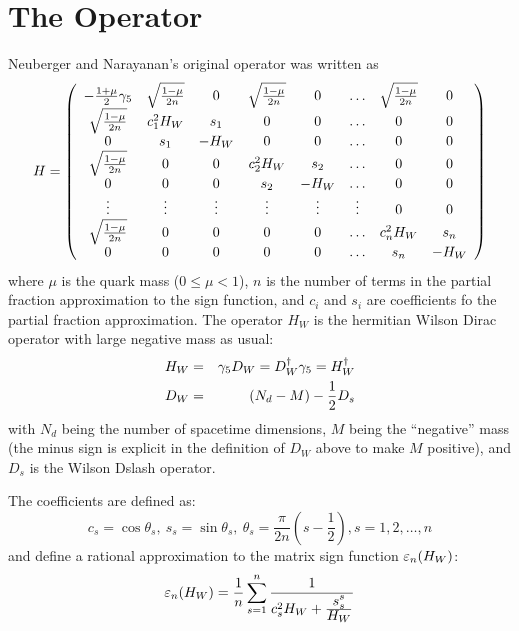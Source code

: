 \documentclass[12pt]{article}
\begin{document}
\section{The Operator}
Neuberger and Narayanan's original operator was written as
\begin{equation}
H = \left( \begin{array}{cccccccc} 
-\frac{1+\mu}{2}\gamma_5 & \sqrt{\frac{1-\mu}{2n}} & 0 & \sqrt{\frac{1-\mu}{2n}} & 0  & \ldots & \sqrt{\frac{1-\mu}{2n}} & 0 \\
\sqrt{\frac{1-\mu}{2n}} & c_1^2 H_W & s_1 &  0 & 0& \ldots & 0 & 0\\
          0            &   s_1     & -H_W &  0 & 0& \ldots & 0 & 0\\
\sqrt{\frac{1-\mu}{2n}} &     0    &  0  & c_2^2 H_W & s_2  & \ldots & 0 & 0 \\
          0             &     0    &  0  & s_2       & -H_W & \ldots & 0 & 0 \\
       \vdots           &   \vdots & \vdots & \vdots & \vdots & \vdots & 0 & 0 \\
\sqrt{\frac{1-\mu}{2n}} &     0    &  0 &  0         & 0     & \ldots & c_n^2 H_W & s_n \\
         0              &     0    &  0 &  0         &  0    & \ldots & s_{n} & -H_W \\
\end{array} \right)
\end{equation}
where $\mu$ is the quark mass ($0 \le \mu < 1$), $n$ is the number of terms
in the partial fraction approximation to the sign function, and $c_{i}$ and $s_i$ are coefficients fo the partial fraction approximation. The operator $H_W$ is
the hermitian Wilson Dirac operator with large negative mass as usual:
\begin{eqnarray}
H_W &=& \gamma_5 D_W = D_W^{\dagger} \gamma_5 = H_W^{\dagger}\\
D_W &=& (N_d - M) - \frac{1}{2} D_s
\end{eqnarray}
with $N_d$ being the number of spacetime dimensions, $M$ being the 
``negative'' mass (the minus sign is explicit in the definition of $D_W$
above to make $M$ positive), and $D_s$ is the Wilson Dslash operator.

The coefficients are defined as: 
\begin{equation}
c_s = \cos \theta_s,\  s_s = \sin \theta_s, \ \theta_s = \frac{\pi}{2n}(s - \frac{1}{2}), s = 1, 2, \ldots, n
\end{equation}
and define a rational approximation to the matrix sign function $\varepsilon_{n}(H_W)$:
\begin{equation}
\varepsilon_{n}(H_W) = \frac{1}{n}\sum_{s=1}^{n} \frac{1}{c_s^2 H_W + \frac{\displaystyle s_s^s}{\displaystyle H_W}}
\end{equation}
\end{document}
